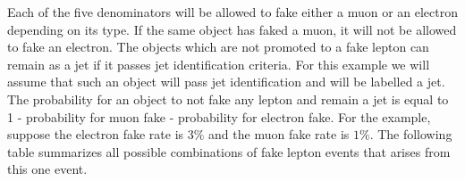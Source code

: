 \documentclass{cmspaper}
\begin{document}
\vspace*{0.5cm}

Each of the five denominators will be allowed to fake either a muon or an electron depending on its type. If the same object has faked a muon, it will not be allowed to fake an electron. The objects which are not promoted to a fake lepton can remain as a jet if it passes jet identification criteria. For this example we will assume that such an object will pass jet identification and will be labelled a jet. The probability for an object to not fake any lepton and remain a jet is equal to 1 - probability for muon fake - probability for electron fake. For the example, suppose the electron fake rate is $3\%$ and the muon fake rate is $1\%$. The following table summarizes all possible combinations of fake lepton events that arises from this one event.


\end{document}

